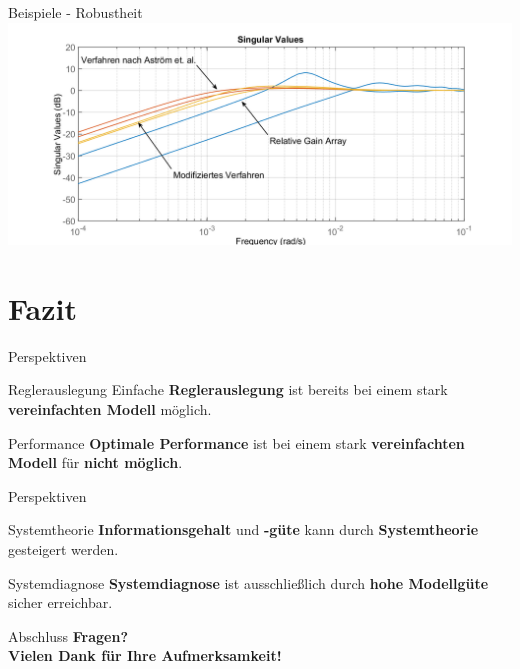 \documentclass[fleqn,11pt,aspectratio=43]{beamer}
\begin{document}
\begin{frame}{Beispiele - Robustheit}
\centering
\includegraphics[width=\textwidth]{SVD}
\end{frame}

\section{Fazit}

\begin{frame}[highlight]{Perspektiven}
\begin{alertblock}{Reglerauslegung}
Einfache \textbf{Reglerauslegung} ist bereits bei einem stark \textbf{vereinfachten Modell} möglich.
\end{alertblock}
\begin{alertblock}{Performance}
\textbf{Optimale Performance} ist bei einem stark \textbf{vereinfachten Modell} für \textbf{nicht möglich}.
\end{alertblock}
\end{frame}


\begin{frame}[highlight]{Perspektiven}
\begin{block}{Systemtheorie}
\textbf{Informationsgehalt} und \textbf{-güte} kann durch \textbf{Systemtheorie} gesteigert werden.
\end{block}
\begin{block}{Systemdiagnose}
\textbf{Systemdiagnose} ist ausschließlich durch \textbf{hohe Modellgüte} sicher erreichbar.
\end{block}
\end{frame}


\begin{frame}{Abschluss}
\centering
\textbf{{\huge Fragen?}} \pause \\ \textbf{{\huge Vielen Dank für Ihre Aufmerksamkeit!}}
\end{frame}
\end{document}
